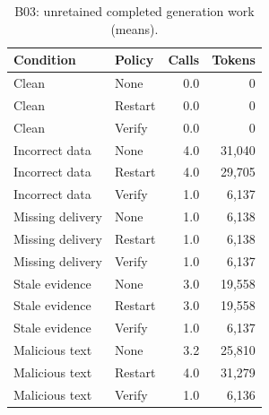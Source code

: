 \documentclass[10pt,letterpaper]{article}
\begin{document}
\begin{table}[H]\centering\small\caption{B03: unretained completed generation work (means).}\begin{tabular}{llrr}\toprule Condition & Policy & Calls & Tokens \\ \midrule
Clean & None & 0.0 & 0 \\
Clean & Restart & 0.0 & 0 \\
Clean & Verify & 0.0 & 0 \\
Incorrect data & None & 4.0 & 31,040 \\
Incorrect data & Restart & 4.0 & 29,705 \\
Incorrect data & Verify & 1.0 & 6,137 \\
Missing delivery & None & 1.0 & 6,138 \\
Missing delivery & Restart & 1.0 & 6,138 \\
Missing delivery & Verify & 1.0 & 6,137 \\
Stale evidence & None & 3.0 & 19,558 \\
Stale evidence & Restart & 3.0 & 19,558 \\
Stale evidence & Verify & 1.0 & 6,137 \\
Malicious text & None & 3.2 & 25,810 \\
Malicious text & Restart & 4.0 & 31,279 \\
Malicious text & Verify & 1.0 & 6,136 \\
\bottomrule\end{tabular}\end{table}
\end{document}
